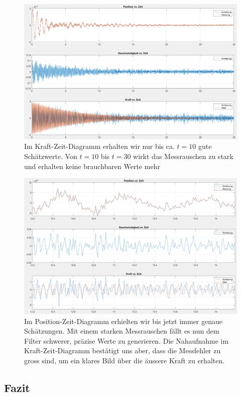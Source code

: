 \begin{figure}
	\begin{center}
		\includegraphics[width=\linewidth,keepaspectratio]{papers/erdbeben/Messrauschen_geaendert.PNG}
		\caption{Im Kraft-Zeit-Diagramm erhalten wir nur bis ca. $t = 10$ gute Schätzwerte. Von $t = 10$ bis $t = 30$ wirkt das Messrauschen zu stark und erhalten keine brauchbaren Werte mehr}
	 \label{erdbeben:fig:messrauschen-geaendert}
	\end{center}
\end{figure}

\begin{figure}
	\begin{center}
		\includegraphics[width=\linewidth,keepaspectratio]{papers/erdbeben/Messrauschen_geaendert_zoom.PNG}
		\caption{Im Position-Zeit-Diagramm erhielten wir bis jetzt immer genaue Schätzungen. Mit einem starken Messrauschen fällt es nun dem Filter schwerer, präzise Werte zu generieren. Die Nahaufnahme im Kraft-Zeit-Diagramm bestätigt uns aber, dass die Messfehler zu gross sind, um ein klares Bild über die äussere Kraft zu erhalten.}
		\label{erdbeben:fig:messrauschen-geaendert_zoom}
	\end{center}
\end{figure}

\subsection{Fazit}


